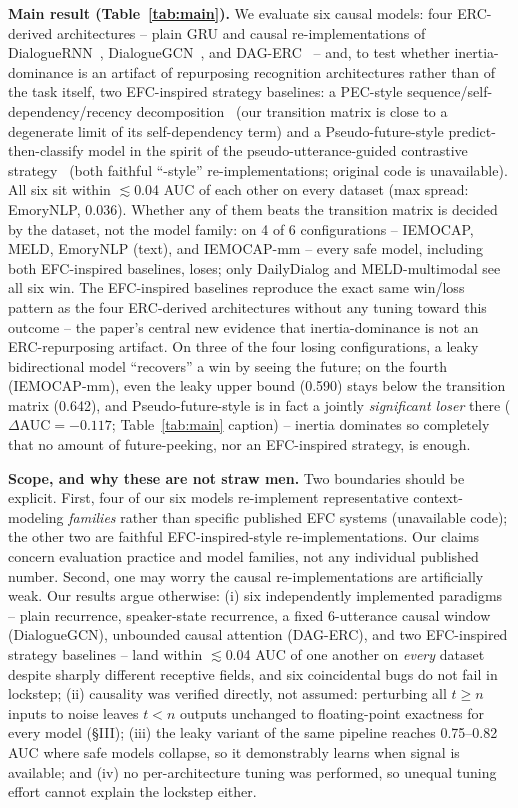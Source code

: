 \documentclass[conference]{IEEEtran}
\begin{document}
\textbf{Main result (Table~\ref{tab:main}).} We evaluate six causal models: four ERC-derived
architectures -- plain GRU and causal re-implementations of DialogueRNN~\cite{majumder2019dialoguernn},
DialogueGCN~\cite{ghosal2019dialoguegcn}, and DAG-ERC~\cite{shen2021dagerc} -- and, to test whether
inertia-dominance is an artifact of repurposing recognition architectures rather than of the task
itself, two EFC-inspired strategy baselines: a PEC-style sequence/self-dependency/recency
decomposition~\cite{altarawneh2023pec} (our transition matrix is close to a degenerate limit of its
self-dependency term) and a Pseudo-future-style predict-then-classify model in the spirit of the
pseudo-utterance-guided contrastive strategy~\cite{xie2025pugcn} (both faithful ``-style''
re-implementations; original code is unavailable). All six sit within $\lesssim$0.04 AUC of each
other on every dataset (max spread: EmoryNLP, 0.036). Whether any of them beats the transition
matrix is decided by the dataset, not the model family: on 4 of 6 configurations -- IEMOCAP, MELD,
EmoryNLP (text), and IEMOCAP-mm -- every safe model, including both EFC-inspired baselines, loses;
only DailyDialog and MELD-multimodal see all six win. The EFC-inspired baselines reproduce the exact
same win/loss pattern as the four ERC-derived architectures without any tuning toward this outcome
-- the paper's central new evidence that inertia-dominance is not an ERC-repurposing artifact. On
three of the four losing configurations, a leaky bidirectional model ``recovers'' a win by seeing
the future; on the fourth (IEMOCAP-mm), even the leaky upper bound (0.590) stays below the
transition matrix (0.642), and Pseudo-future-style is in fact a jointly \emph{significant loser}
there ($\Delta$AUC$=-0.117$; Table~\ref{tab:main} caption) -- inertia dominates so completely that
no amount of future-peeking, nor an EFC-inspired strategy, is enough.

\textbf{Scope, and why these are not straw men.} Two boundaries should be explicit. First, four of
our six models re-implement representative context-modeling \emph{families} rather than specific
published EFC systems (unavailable code); the other two are faithful EFC-inspired-style
re-implementations. Our claims concern evaluation practice and model families, not any individual
published number. Second, one may worry the causal re-implementations are artificially weak. Our
results argue otherwise: (i) six independently implemented paradigms -- plain recurrence,
speaker-state recurrence, a fixed 6-utterance causal window (DialogueGCN), unbounded causal
attention (DAG-ERC), and two EFC-inspired strategy baselines -- land within $\lesssim$0.04 AUC of one another
on \emph{every} dataset despite sharply different receptive fields, and six coincidental bugs do
not fail in lockstep; (ii) causality was verified directly, not assumed: perturbing all $t\geq n$
inputs to noise leaves $t<n$ outputs unchanged to floating-point exactness for every model (\S III);
(iii) the leaky variant of the same pipeline reaches 0.75--0.82 AUC where safe models collapse, so
it demonstrably learns when signal is available; and (iv) no per-architecture tuning was performed,
so unequal tuning effort cannot explain the lockstep either.
\end{document}
